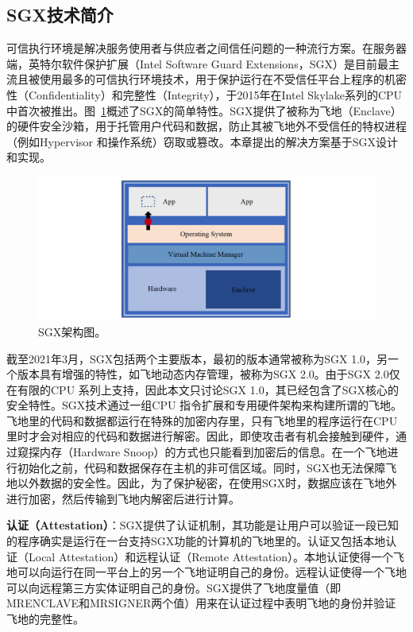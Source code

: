\subsection{SGX技术简介}
可信执行环境是解决服务使用者与供应者之间信任问题的一种流行方案。在服务器端，英特尔软件保护扩展（Intel Software Guard Extensions，SGX）是目前最主流且被使用最多的可信执行环境技术，用于保护运行在不受信任平台上程序的机密性（Confidentiality）和完整性（Integrity），于2015年在Intel Skylake系列的CPU中首次被推出。图~\ref{sgx_arch}概述了SGX的简单特性。SGX提供了被称为飞地（Enclave）的硬件安全沙箱，用于托管用户代码和数据，防止其被飞地外不受信任的特权进程（例如Hypervisor 和操作系统）窃取或篡改。本章提出的解决方案基于SGX设计和实现。

\begin{figure}[h]
    \centerline{\includegraphics[width=\textwidth]{figures/sgx-arch.png}}
    \caption{SGX架构图。}
    \label{sgx_arch}
\end{figure}

截至2021年3月，SGX包括两个主要版本，最初的版本通常被称为SGX 1.0，另一个版本具有增强的特性，如飞地动态内存管理，被称为SGX 2.0。由于SGX 2.0仅在有限的CPU 系列上支持，因此本文只讨论SGX 1.0，其已经包含了SGX核心的安全特性。SGX技术通过一组CPU 指令扩展和专用硬件架构来构建所谓的飞地。飞地里的代码和数据都运行在特殊的加密内存里，只有飞地里的程序运行在CPU 里时才会对相应的代码和数据进行解密。因此，即使攻击者有机会接触到硬件，通过窥探内存（Hardware Snoop）的方式也只能看到加密后的信息。在一个飞地进行初始化之前，代码和数据保存在主机的非可信区域。同时，SGX也无法保障飞地以外数据的安全性。因此，为了保护秘密，在使用SGX时，数据应该在飞地外进行加密，然后传输到飞地内解密后进行计算。

\textbf{认证（Attestation）}：SGX提供了认证机制，其功能是让用户可以验证一段已知的程序确实是运行在一台支持SGX功能的计算机的飞地里的。认证又包括本地认证（Local Attestation）和远程认证（Remote Attestation）。本地认证使得一个飞地可以向运行在同一平台上的另一个飞地证明自己的身份。远程认证使得一个飞地可以向远程第三方实体证明自己的身份。SGX提供了飞地度量值（即MRENCLAVE和MRSIGNER两个值）用来在认证过程中表明飞地的身份并验证飞地的完整性。

